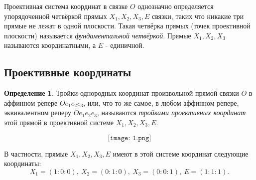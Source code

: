 \documentclass[a4paper, 12pt]{article}
\theoremstyle{definition}
\newtheorem*{definition}{Определение}
\begin{document}
Проективная система координат в связке $O$ однозначно определяется упорядоченной четвёркой прямых $X_1, X_2, X_3, E$ связки, таких что никакие три прямые не лежат в одной плоскости. Такая четвёрка прямых (точек проективной плоскости) называется \textit{фундаментальной четвёркой}. Прямые $X_1, X_2, X_3$ называются координатными, а $E$ - единичной.

\subsection{Проективные координаты}
\begin{definition}
    Тройки однородных координат произвольной прямой связки $O$ в аффинном репере $Oe_1e_2e_3$, или, что то же самое, в любом аффинном репере, эквивалентном реперу $Oe_1e_2e_3$, называются \textit{тройками проективных координат} этой прямой в проективной системе $X_1, X_2, X_3, E$.
\end{definition}

\[\texttt{[image: 1.png]}\]

В частности, прямые $X_1, X_2, X_3, E$ имеют в этой системе координат следующие координаты:
\[ X_1 = (1:0:0), \ X_2 = (0:1:0), \ X_3 = (0:0:1), \ E = (1:1:1). \]
\end{document}

